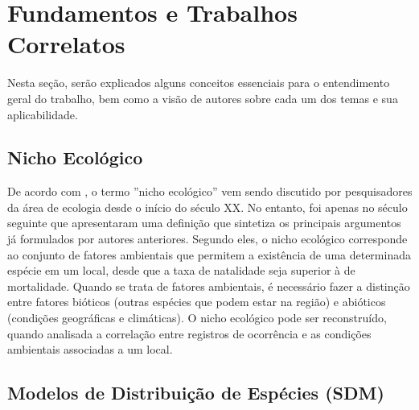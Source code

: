 \chapter{Fundamentos e Trabalhos Correlatos}
Nesta seção, serão explicados alguns conceitos essenciais para o entendimento geral do trabalho, bem como a visão de autores sobre cada um dos temas e sua aplicabilidade. 

\section{Nicho Ecológico}
De acordo com , o termo ''nicho ecológico'' vem sendo discutido por pesquisadores da área de ecologia desde o início do século XX. No entanto, foi apenas no século seguinte que  apresentaram uma definição que sintetiza os principais argumentos já formulados por autores anteriores. Segundo eles, o nicho ecológico corresponde ao conjunto de fatores ambientais que permitem a existência de uma determinada espécie em um local, desde que a taxa de natalidade seja superior à de mortalidade. Quando se trata de fatores ambientais, é necessário fazer a distinção entre fatores bióticos (outras espécies que podem estar na região) e abióticos (condições geográficas e climáticas). 
O nicho ecológico pode ser reconstruído, quando analisada a correlação entre registros de ocorrência e as condições ambientais associadas a um local\cite{Mota-Vargas:2019}.


\section{Modelos de Distribuição de Espécies (SDM)}\label{sec:sdm}

